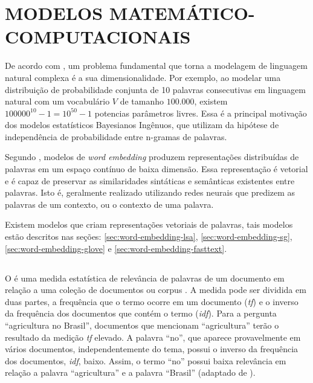 
\section{MODELOS MATEMÁTICO-COMPUTACIONAIS}
\label{sec:pln-modelos-matematico-computacionais}

De acordo com \textcite{Bengio2003ANeuralProbabilistic}, um problema fundamental que torna a modelagem de linguagem natural complexa é a sua dimensionalidade. Por exemplo, ao modelar uma distribuição de probabilidade conjunta de 10 palavras consecutivas em linguagem natural com um vocabulário $V$ de tamanho $100.000$, existem $100000^{10} -1 = 10^{50} -1$ potencias parâmetros livres. Essa é a principal motivação dos modelos estatísticos Bayesianos Ingênuos, que utilizam da hipótese de independência de probabilidade entre n-gramas de palavras. 

Segundo \textcite{EthayarajhEtal2019Understanding}, modelos de \textit{word embedding} produzem representações distribuídas de palavras em um espaço contínuo de baixa dimensão. Essa representação é vetorial e é capaz de preservar as similaridades sintáticas e semânticas existentes entre palavras. Isto é, geralmente realizado utilizando redes neurais que predizem as palavras de um contexto, ou o contexto de uma palavra.

Existem modelos que criam representações vetoriais de palavras, tais modelos estão descritos nas seções: \ref{sec:word-embedding-lsa}, \ref{sec:word-embedding-sg}, \ref{sec:word-embedding-glove} e \ref{sec:word-embedding-fasttext}.

\subsection{}

O  é uma medida estatística de relevância de palavras de um documento em relação a uma coleção de documentos ou corpus \cite{Rajaraman2011Mining}. A medida pode ser dividida em duas partes, a frequência que o termo ocorre em um documento (\textit{tf}) e o inverso da frequência dos documentos que contém o termo (\textit{idf}). Para a pergunta \enquote{agricultura no Brasil}, documentos que mencionam \enquote{agricultura} terão o resultado da medição \textit{tf} elevado. A palavra \enquote{no}, que aparece provavelmente em vários documentos, independentemente do tema, possui o inverso da frequência dos documentos, \textit{idf}, baixo. Assim, o termo \enquote{no} possui baixa relevância em relação a palavra \enquote{agricultura} e a palavra \enquote{Brasil} (adaptado de \textcite{Russell2009Artificial}).

